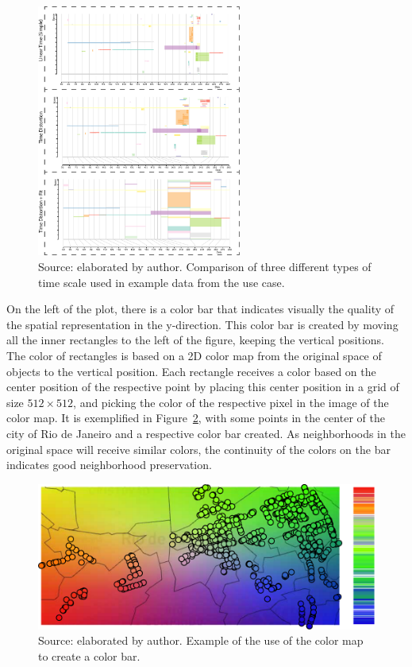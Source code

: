 \begin{figure}
    \centering
    \includegraphics[width = 0.6\textwidth]{src/imgs/time-scale-explanation.pdf}
    \caption{Source: elaborated by author. Comparison of three different types of time scale used in example data from the use case.}
    \label{fig:time-scale-explanation}
\end{figure}

On the left of the plot, there is a color bar that indicates visually the quality of the spatial representation in the y-direction. 
%
This color bar is created by moving all the inner rectangles to the left of the figure, keeping the vertical positions.
%
The color of rectangles is based on a 2D color map from the original space of objects to the vertical position.
%
Each rectangle receives a color based on the center position of the respective point by placing this center position in a grid of size $512\times 512$, and picking the color of the respective pixel in the image of the color map.
%
It is exemplified in Figure~\ref{fig:colormap-example}, with some points in the center of the city of Rio de Janeiro and a respective color bar created.
%
As neighborhoods in the original space will receive similar colors, the continuity of the colors on the bar indicates good neighborhood preservation.

\begin{figure}
    \centering
    \includegraphics[width = 0.6\linewidth]{src/imgs/colormap-example.pdf}
    \caption{Source: elaborated by author. Example of the use of the color map to create a color bar.}
    \label{fig:colormap-example}
\end{figure}

